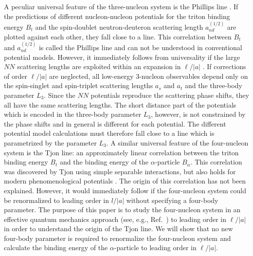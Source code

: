 \documentclass[prc,preprint,tightenlines,showpacs]{revtex4}
\begin{document}
A peculiar universal feature of the three-nucleon system is the Phillips 
line \cite{Phillips68}. If the predictions of different nucleon-nucleon
potentials for the triton binding energy $B_t$ and the spin-doublet
neutron-deuteron scattering length  $a_{nd}^{(1/2)}$ are plotted
against each other, they fall close to a line.
This correlation between $B_t$ and $a_{nd}^{(1/2)}$ is called the 
Phillips line and can not be understood in conventional potential
models. However, it immediately follows from universality if the 
large $NN$ scattering lengths are exploited within an expansion in  
$\ell/|a|$ \cite{EfiTk85,Bedaque:1999ve}. 
If corrections of order $\ell/|a|$ are neglected, all low-energy
3-nucleon observables depend only on the spin-singlet and spin-triplet
scattering lengths $a_s$ and $a_t$ and the three-body parameter $L_3$.
Since the $NN$ potentials reproduce the 
scattering phase shifts, they all have the same scattering
lengths. The short distance part of the potentials which is encoded
in the three-body parameter $L_3$, however, is
not constrained by the phase shifts and in general is different for 
each potential. The different potential model calculations must therefore
fall close to a line which is parametrized by the 
parameter $L_3$.
A similar universal feature of the four-nucleon system is
the Tjon line: an approximately linear correlation between the 
triton binding energy $B_t$ and the binding energy of the $\alpha$-particle
 $B_\alpha$. This correlation was discovered
by Tjon \cite{Tjo75} using simple separable interactions,
but also holds for modern phenomenological potentials \cite{Nogga:2000uu}. 
The origin of this correlation has not been explained. However, it
would immediately follow if the four-nucleon system could be renormalized
to leading order in $l/|a|$ without specifying a four-body parameter.
The purpose of this paper is to study the four-nucleon system 
in an effective quantum mechanics approach (see, e.g.,
Ref.~\cite{Lepage:1997cs}) 
to leading order in $\ell/|a|$ in order to understand the origin of the 
Tjon line. We will show that no new four-body parameter is required
to renormalize the four-nucleon system and calculate the binding
energy of the $\alpha$-particle to leading order in $\ell/|a|$. 
\end{document}
